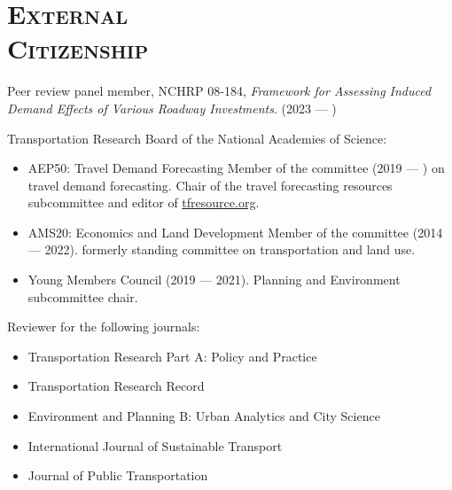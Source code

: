 \documentclass[margin,line]{res}
\newcommand{\secfont}{\scshape }
\newcommand{\acc}{\scshape }
\begin{document}
\begin{resume}
\begin{description}
\end{description}

\noindent\makebox[\linewidth]{\rule{\linewidth}{0.4pt}}
\section{\secfont External \\ Citizenship}



Peer review panel member, NCHRP 08-184, \textit{Framework for Assessing Induced Demand Effects of Various Roadway Investments}. (2023 --- )


Transportation Research Board of the National Academies of Science:

\begin{itemize}
  \item AEP50: Travel Demand Forecasting Member of the committee (2019 --- ) on
  travel demand forecasting. Chair of the travel forecasting resources
  subcommittee and editor of \url{tfresource.org}.
  \item AMS20: Economics and Land Development Member of the committee (2014
  --- 2022). formerly standing committee on transportation and land use.
  \item Young Members Council (2019 --- 2021). Planning and Environment subcommittee
  chair.
\end{itemize}


Reviewer for the following journals:

\begin{itemize}
  \item Transportation Research Part A: Policy and Practice
  \item Transportation Research Record
  \item Environment and Planning B: Urban Analytics and City Science
  \item International Journal of Sustainable Transport
  \item Journal of Public Transportation
\end{itemize}


\end{resume}
\end{document}

